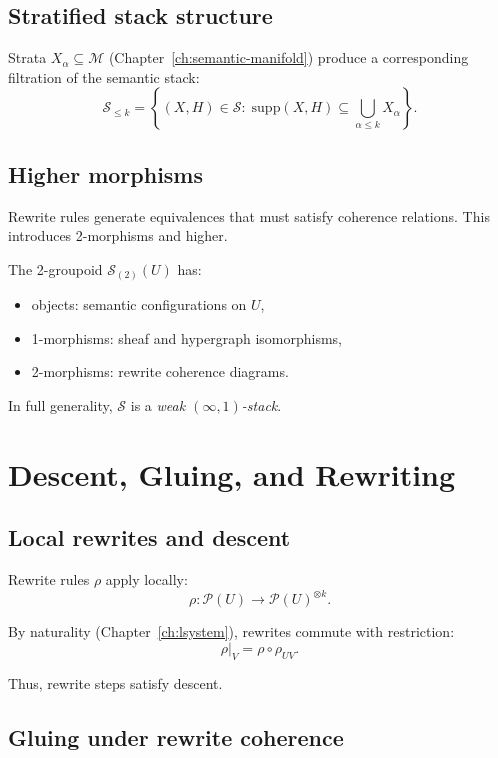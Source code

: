 \subsection{Stratified stack structure}

Strata $X_\alpha\subseteq\mathcal{M}$ (Chapter~\ref{ch:semantic-manifold})
produce a corresponding filtration of the semantic stack:
\[
\mathcal{S}_{\le k}
=
\left\{
(X,H)\in\mathcal{S}
:\;
\mathrm{supp}(X,H)\subseteq \bigcup_{\alpha\le k} X_\alpha
\right\}.
\]

\subsection{Higher morphisms}

Rewrite rules generate equivalences that must satisfy coherence relations.
This introduces 2-morphisms and higher.

\begin{definition}
The 2-groupoid $\mathcal{S}_{(2)}(U)$ has:
\begin{itemize}
  \item objects: semantic configurations on $U$,
  \item 1-morphisms: sheaf and hypergraph isomorphisms,
  \item 2-morphisms: rewrite coherence diagrams.
\end{itemize}
\end{definition}

In full generality, $\mathcal{S}$ is a \emph{weak $(\infty,1)$-stack}.

\section{Descent, Gluing, and Rewriting}

\subsection{Local rewrites and descent}

Rewrite rules $\rho$ apply locally:
\[
\rho: \mathscr{P}(U)\to\mathscr{P}(U)^{\otimes k}.
\]

By naturality (Chapter~\ref{ch:lsystem}), rewrites commute with restriction:
\[
\rho|_V = \rho\circ\rho_{UV}.
\]

Thus, rewrite steps satisfy descent.

\subsection{Gluing under rewrite coherence}

